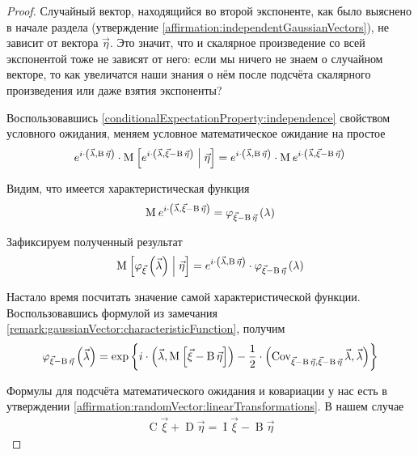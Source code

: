 \begin{proof}
  Случайный вектор, находящийся во второй экспоненте, как было выяснено в
  начале раздела (утверждение \ref{affirmation:independentGaussianVectors}),
  не зависит от вектора $\vec{\eta}$. Это значит, что и скалярное произведение
  со всей экспонентой тоже не зависят от него: если мы ничего не знаем о
  случайном векторе, то как увеличатся наши знания о нём после подсчёта
  скалярного произведения или даже взятия экспоненты?

  Воспользовавшись \ref{conditionalExpectationProperty:independence} свойством
  условного ожидания, меняем условное математическое ожидание на простое
  $$e^{i \cdot \left( \vec{\lambda}, \operatorname{B} \vec{\eta} \right)}
      \cdot \operatorname{M}_{} \left[ e^{i \cdot \left( \vec{\lambda},
          \vec{\xi} - \operatorname{B} \vec{\eta} \right)}
      \;\middle|\; \vec{\eta} \right]
      = e^{i \cdot \left( \vec{\lambda}, \operatorname{B} \vec{\eta} \right)}
          \cdot \operatorname{M}_{} e^{i \cdot \left( \vec{\lambda},
        \vec{\xi} - \operatorname{B} \vec{\eta} \right)}$$

  Видим, что имеется характеристическая функция
  $$\operatorname{M}_{} e^{i \cdot \left( \vec{\lambda},
      \vec{\xi} - \operatorname{B} \vec{\eta} \right)}
      = \varphi_{\vec{\xi} - \operatorname{B} \vec{\eta}}\left(
      \lambda \right)$$

  Зафиксируем полученный результат
  \begin{equation}\label{eq:normalCor:conditionalExpectation}
      \operatorname{M}_{} \left[ \varphi_{\vec{\xi}}\left( \vec{\lambda} \right) \;\middle|\; \vec{\eta} \right]
      = e^{i \cdot \left( \vec{\lambda}, \operatorname{B} \vec{\eta} \right)}
      \cdot \varphi_{\vec{\xi} - \operatorname{B} \vec{\eta}}\left(
          \lambda \right)
  \end{equation}

  Настало время посчитать значение самой характеристической функции.
  Воспользовавшись формулой из замечания
  \ref{remark:gaussianVector:characteristicFunction}, получим
  \begin{align*}
      \varphi_{\vec{\xi} - \operatorname{B} \vec{\eta}}\left(
      \vec{\lambda} \right)
      = \exp{\left\{ i \cdot \left( \vec{\lambda},
      \Mean{\vec{\xi} - \operatorname{B} \vec{\eta}} \right)
      - \frac{1}{2} \cdot \left( \dCov{\vec{\xi}
          - \operatorname{B} \vec{\eta}} \vec{\lambda},
          \vec{\lambda} \right) \right\}}
  \end{align*}

  Формулы для подсчёта математического ожидания и ковариации у нас есть в
  утверждении \ref{affirmation:randomVector:linearTransformations}.
  В нашем случае
  \begin{align*}
      \operatorname{C} \vec{\xi} + \operatorname{D} \vec{\eta}
      = \operatorname{I} \vec{\xi} - \operatorname{B} \vec{\eta}
  \end{align*}


\end{proof}
